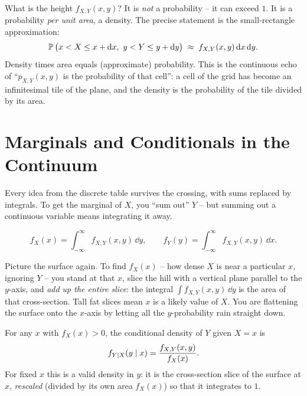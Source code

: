 \begin{happeningbox}
What is the height $f_{X,Y}(x,y)$? It is \emph{not} a probability -- it
can exceed $1$. It is a probability \emph{per unit area}, a density. The precise
statement is the small-rectangle approximation:
\[
  \operatorname{\mathbb{P}}\big(x < X \le x+\mathrm{d} x,\ y < Y \le y+\mathrm{d} y\big)
  \;\approx\; f_{X,Y}(x,y)\,\mathrm{d} x\,\mathrm{d} y .
\]
Density times area equals (approximate) probability. This is the continuous echo
of ``$p_{X,Y}(x,y)$ is the probability of that cell'': a cell of the grid has
become an infinitesimal tile of the plane, and the density is the probability of
the tile divided by its area.
\end{happeningbox}

\section{Marginals and Conditionals in the Continuum}
\label{ch13:continuous-marg-cond}

Every idea from the discrete table survives the crossing, with sums replaced by
integrals. To get the marginal of $X$, you ``sum out'' $Y$ -- but summing out a
continuous variable means integrating it away.

\begin{definition}
\label{ch13:def-marginal-pdf}
\[
  f_X(x) = \int_{-\infty}^{\infty} f_{X,Y}(x,y)\,\dd y,
  \qquad
  f_Y(y) = \int_{-\infty}^{\infty} f_{X,Y}(x,y)\,\dd x.
\]
\end{definition}

\begin{intuitionbox}
Picture the surface again. To find $f_X(x)$ -- how dense $X$ is near a particular
$x$, ignoring $Y$ -- you stand at that $x$, slice the hill with a vertical plane
parallel to the $y$-axis, and \emph{add up the entire slice}: the integral
$\int f_{X,Y}(x,y)\,\dd y$ is the area of that cross-section. Tall fat slices mean
$x$ is a likely value of $X$. You are flattening the surface onto the $x$-axis by
letting all the $y$-probability rain straight down.
\end{intuitionbox}

\begin{definition}
\label{ch13:def-cond-pdf}
For any $x$ with $f_X(x)>0$, the conditional density of $Y$ given $X=x$ is
\[
  f_{Y\mid X}(y\mid x) = \frac{f_{X,Y}(x,y)}{f_X(x)} .
\]
For fixed $x$ this is a valid density in $y$: it is the cross-section slice of the
surface at $x$, \emph{rescaled} (divided by its own area $f_X(x)$) so that it
integrates to $1$.
\end{definition}


